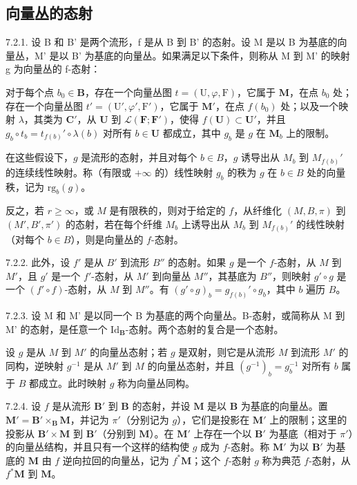 \subsection{向量丛的态射}

7.2.1. 设 B 和 B' 是两个流形，f 是从 B 到 B' 的态射。设 M 是以 B 为基底的向量丛，M' 是以 B' 为基底的向量丛。如果满足以下条件，则称从 M 到 M' 的映射 g 为向量丛的 f-态射：

对于每个点 \(b_0 \in \mathbf{B}\)，存在一个向量丛图 \(t = (\mathrm{U}, \varphi, \mathrm{F})\)，它属于 \(\mathbf{M}\)，在点 \(b_0\) 处；存在一个向量丛图 \(t' = (\mathrm{U}', \varphi', \mathrm{F}')\)，它属于 \(\mathbf{M}'\)，在点 \(f(b_0)\) 处；以及一个映射 \(\lambda\)，其类为 \(\mathbf{C}'\)，从 \(\mathbf{U}\) 到 \(\mathcal{L}(\mathbf{F}; \mathbf{F}')\)，使得 \(f(\mathbf{U}) \subset \mathbf{U}'\)，并且 \(g_b \circ t_b = t_{f(b)}' \circ \lambda(b)\) 对所有 \(b \in \mathbf{U}\) 都成立，其中 \(g_b\) 是 \(g\) 在 \(\mathbf{M}_b\) 上的限制。

在这些假设下，\(g\) 是流形的态射，并且对每个 \(b \in B\)，\(g\) 诱导出从 \(M_b\) 到 \(M_{f(b)}'\) 的连续线性映射。称（有限或 \(+\infty\) 的）线性映射 \(g_b\) 的秩为 \(g\) 在 \(b \in B\) 处的向量秩，记为 \(\text{rg}_b(g)\)。

反之，若 \(r \geqslant \infty\)，或 \(M\) 是有限秩的，则对于给定的 \(f\)，从纤维化 \((M, B, \pi)\) 到 \((M', B', \pi')\) 的态射，若在每个纤维 \(M_b\) 上诱导出从 \(M_b\) 到 \(M_{f(b)}'\) 的线性映射（对每个 \(b \in B\)），则是向量丛的 \(f\)-态射。

7.2.2. 此外，设 \(f'\) 是从 \(B'\) 到流形 \(B''\) 的态射。如果 \(g\) 是一个 \(f\)-态射，从 \(M\) 到 \(M'\)，且 \(g'\) 是一个 \(f'\)-态射，从 \(M'\) 到向量丛 \(M''\)，其基底为 \(B''\)，则映射 \(g' \circ g\) 是一个 \((f' \circ f)\)-态射，从 \(M\) 到 \(M''\)。有 \((g' \circ g)_b = g_{f(b)}' \circ g_b\)，其中 \(b\) 遍历 \(B\)。

7.2.3. 设 M 和 M' 是以同一个 B 为基底的两个向量丛。B-态射，或简称从 M 到 M' 的态射，是任意一个 \(\mathrm{Id}_{\mathbf{B}}\)-态射。两个态射的复合是一个态射。

设 \(g\) 是从 \(M\) 到 \(M'\) 的向量丛态射；若 \(g\) 是双射，则它是从流形 \(M\) 到流形 \(M'\) 的同构，逆映射 \(g^{-1}\) 是从 \(M'\) 到 \(M\) 的向量丛态射，并且 \((g^{-1})_b = g_b^{-1}\) 对所有 \(b\) 属于 \(B\) 都成立。此时映射 \(g\) 称为向量丛同构。

7.2.4. 设 \(f\) 是从流形 \(\mathbf{B}'\) 到 \(\mathbf{B}\) 的态射，并设 \(\mathbf{M}\) 是以 \(\mathbf{B}\) 为基底的向量丛。置 \(\mathbf{M}' = \mathbf{B}' \times_{\mathbf{B}} \mathbf{M}\)，并记为 \(\pi'\)（分别记为 \(g\)），它们是投影在 \(\mathbf{M}'\) 上的限制；这里的投影从 \(\mathbf{B}' \times \mathbf{M}\) 到 \(\mathbf{B}'\)（分别到 \(\mathbf{M}\)）。在 \(\mathbf{M}'\) 上存在一个以 \(\mathbf{B}'\) 为基底（相对于 \(\pi'\)）的向量丛结构，并且只有一个这样的结构使 \(g\) 成为 \(f\)-态射。称 \(\mathbf{M}'\) 为以 \(\mathbf{B}'\) 为基底的 \(\mathbf{M}\) 由 \(f\) 逆向拉回的向量丛，记为 \(f^* \mathbf{M}\)；这个 \(f\)-态射 \(g\) 称为典范 \(f\)-态射，从 \(f^* \mathbf{M}\) 到 \(\mathbf{M}\)。

